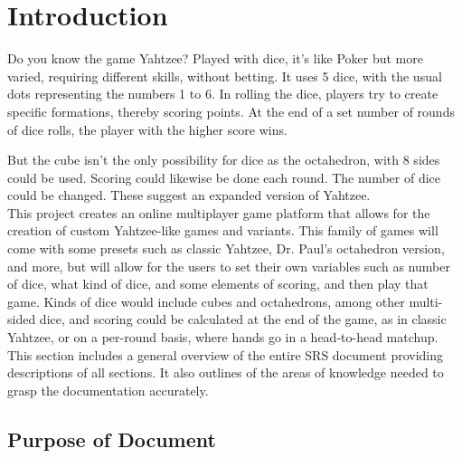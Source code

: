 \section{Introduction}

Do you know the game Yahtzee? Played with dice, it's like Poker but more varied, requiring different skills, without betting. It uses 5 dice, with the usual dots representing the numbers 1 to 6. In rolling the dice, players try to create specific formations, thereby scoring points. At the end of a set number of rounds of dice rolls, the player with the higher score wins.

But the cube isn't the only possibility for dice as the octahedron, with 8 sides could be used. Scoring could likewise be done each round. The number of dice could be changed. These suggest an expanded version of Yahtzee.\\

This project creates an online multiplayer game platform that allows for the creation of custom Yahtzee-like games and variants. This family of games will come with some presets such as classic Yahtzee, Dr. Paul's octahedron version, and more, but will allow for the users to set their own variables such as number of dice, what kind of dice, and some elements of scoring, and then play that game. Kinds of dice would include cubes and octahedrons, among other multi-sided dice, and scoring could be calculated at the end of the game, as in classic Yahtzee, or on a per-round basis, where hands go in a head-to-head matchup.\\

This section includes a general overview of the entire SRS document providing descriptions of all sections. It also outlines of the areas of knowledge needed to grasp the documentation accurately.

\subsection{Purpose of Document}


